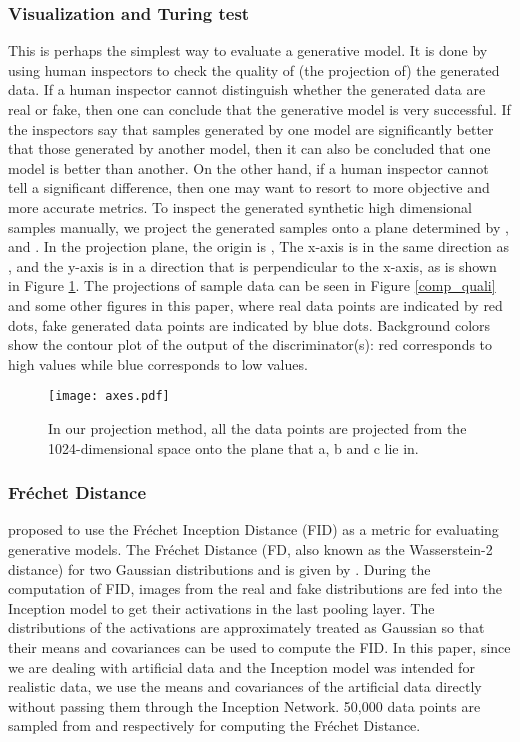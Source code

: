 \documentclass[conference]{IEEEtran}
\begin{document}
\subsubsection {Visualization and Turing test} This is perhaps the simplest way to evaluate a generative model. It is done by using human inspectors to check the quality of (the projection of) the generated data. If a human inspector cannot distinguish whether the generated data are real or fake, then one can conclude that the generative model is very successful. If the inspectors say that samples generated by one model are significantly better that those generated by another model, then it can also be concluded that one model is better than another. On the other hand, if a human inspector cannot tell a significant difference, then one may want to resort to more objective and more accurate metrics. To inspect the generated synthetic high dimensional samples manually, we project the generated samples onto a plane determined by ,  and . In the projection plane, the origin is , The x-axis is in the same direction as , and the y-axis is in a direction that is perpendicular to the x-axis, as is shown in Figure \ref{coordinates}. The projections of sample data can be seen in Figure \ref{comp_quali} and some other figures in this paper, where real data points are indicated by red dots, fake generated data points are indicated by blue dots. Background colors show the contour plot of the output of the discriminator(s): red corresponds to high values while blue corresponds to low values.

\begin{figure}[h]
	\centering
\texttt{[image: axes.pdf]}
	\caption{In our projection method, all the data points are projected from the 1024-dimensional space onto the plane that a, b and c lie in.}
	\label{coordinates}
\end{figure}
\subsubsection {Fréchet Distance} 
\cite{FID} proposed to use the Fréchet Inception Distance (FID) as a metric for evaluating generative models. The Fréchet Distance (FD, also known as the Wasserstein-2 distance) for two Gaussian distributions  and  is given by  \cite{FD}. During the computation of FID, images from the real and fake distributions are fed into the Inception model \cite{inception} to get their activations in the last pooling layer. The distributions of the activations are approximately treated as Gaussian so that their means and covariances can be used to compute the FID. In this paper, since we are dealing with artificial data and the Inception model was intended for realistic data, we use the means and covariances of the artificial data directly without passing them through the Inception Network. 50,000 data points are sampled from  and  respectively for computing the Fréchet Distance.
\end{document}
